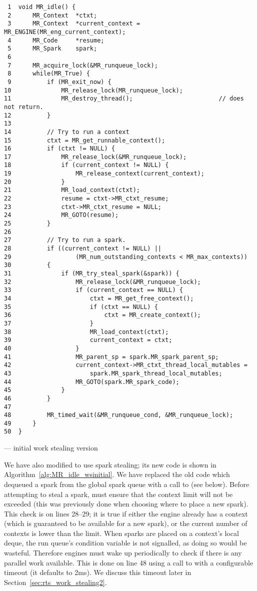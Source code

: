 \begin{algorithm}[tbp]
\begin{verbatim}
 1  void MR_idle() {
 2      MR_Context  *ctxt;
 3      MR_Context  *current_context = MR_ENGINE(MR_eng_current_context);
 4      MR_Code     *resume;
 5      MR_Spark    spark;
 6
 7      MR_acquire_lock(&MR_runqueue_lock);
 8      while(MR_True) {
 9          if (MR_exit_now) {
10              MR_release_lock(MR_runqueue_lock);
11              MR_destroy_thread();                        // does not return.
12          }
13
14          // Try to run a context
15          ctxt = MR_get_runnable_context();
16          if (ctxt != NULL) { 
17              MR_release_lock(&MR_runqueue_lock);
18              if (current_context != NULL) {
19                  MR_release_context(current_context);
20              }
21              MR_load_context(ctxt);
22              resume = ctxt->MR_ctxt_resume;
23              ctxt->MR_ctxt_resume = NULL;
24              MR_GOTO(resume);
25          }
26      
27          // Try to run a spark.
28          if ((current_context != NULL) ||
29                  (MR_num_outstanding_contexts < MR_max_contexts))
30          {
31              if (MR_try_steal_spark(&spark)) {
32                  MR_release_lock(&MR_runqueue_lock);
33                  if (current_context == NULL) {
34                      ctxt = MR_get_free_context();
35                      if (ctxt == NULL) {
36                          ctxt = MR_create_context();
37                      }
38                      MR_load_context(ctxt);
39                      current_context = ctxt;
40                  }
41                  MR_parent_sp = spark.MR_spark_parent_sp;
42                  current_context->MR_ctxt_thread_local_mutables =
43                      spark.MR_spark_thread_local_mutables;
44                  MR_GOTO(spark.MR_spark_code);
45              }
46          }
47
48          MR_timed_wait(&MR_runqueue_cond, &MR_runqueue_lock);
49      }
50  }
\end{verbatim}
\caption{\idle --- initial work stealing version}
\label{alg:MR_idle_wsinitial}
\end{algorithm}

We have also modified \idle to use spark stealing;
its new code is shown in Algorithm~\ref{alg:MR_idle_wsinitial}.
We have replaced the old code which dequeued a spark from the global spark
queue
with a call to \trystealspark (see below).
Before attempting to steal a spark,
\idle must ensure that the context limit will not be exceeded
(this was previously done when choosing where to place a new spark).
This check is on lines 28--29; it is true if either
the engine already has a context (which is guaranteed to be available for a
new spark),
or the current number of contexts is lower than the limit.
When sparks are placed on a context's local deque,
the run queue's condition variable is not signalled,
as doing so would be wasteful.
Therefore engines must wake up periodically to check if there is any
parallel work available.
This is done on line 48 using a call to  with a
configurable timeout (it defaults to 2ms).
We discuss this timeout later in Section~\ref{sec:rts_work_stealing2}.

